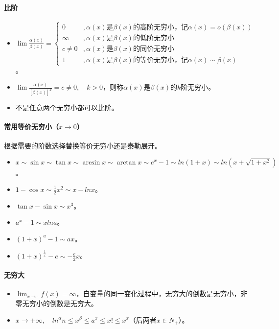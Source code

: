 \documentclass[
12pt, %
a4paper, 
oneside, %
]{scrartcl}
\begin{document}
\paragraph{比阶}
\begin{itemize}
\item $ \lim \frac{\alpha(x)}{\beta(x)} = \begin{cases} 0 &, \alpha(x) \text{是} \beta(x) \text{的高阶无穷小，记} \alpha(x) = o(\beta(x)) \\ \infty &, \alpha(x) \text{是} \beta(x) \text{的低阶无穷小} \\ c \neq 0 &, \alpha(x) \text{是} \beta(x) \text{的同价无穷小} \\ 1 &, \alpha(x) \text{是} \beta(x) \text{的等价无穷小，记} \alpha(x) \sim \beta(x) \end{cases} $。
\item $ \lim \frac{\alpha(x)}{[\beta(x)]^k} = c \neq 0, \quad k > 0 $，则称$ \alpha(x) $是$ \beta(x) $的$ k $阶无穷小。
\item 不是任意两个无穷小都可以比阶。
\end{itemize}
\paragraph{常用等价无穷小（$ x \rightarrow 0 $）}
根据需要的阶数选择替换等价无穷小还是泰勒展开。
\begin{itemize}
\item $ x \sim \sin x \sim \tan x \sim \arcsin x \sim \arctan x \sim e^x -1 \sim ln(1 + x) \sim ln(x + \sqrt{1 + x^2}) $。
\item $ 1 - \cos x \sim \frac{1}{2}x^2 \sim x - lnx $。
\item $ \tan x - \sin x \sim x^3 $。
\item $ a^x -1 \sim x ln a $。
\item $ (1 + x)^a - 1 \sim ax $。
\item $ (1 + x)^{\frac{1}{x}} - e \sim -\frac{e}{2}x $。
\end{itemize}
\paragraph{无穷大}
\begin{itemize}
\item $ \lim_{x \to \cdot} f(x) = \infty $，自变量的同一变化过程中，无穷大的倒数是无穷小，非零无穷小的倒数是无穷大。
\item $ x \rightarrow + \infty, \quad ln^\alpha n \leq x^\beta \leq a^x \leq x! \leq x^x $（后两者$ x \in N_+ $）。
\end{itemize}
\end{document}
